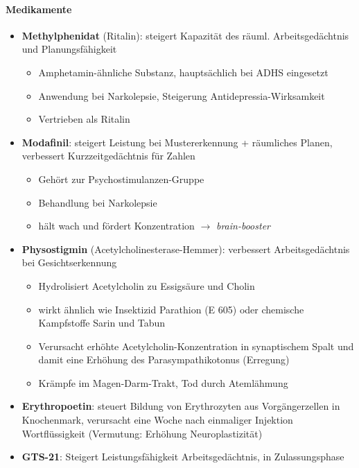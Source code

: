 \paragraph{Medikamente}
\begin{itemize}
  \item \textbf{Methylphenidat} (Ritalin): steigert Kapazität des räuml. Arbeitsgedächtnis und Planungsfähigkeit
  \begin{itemize}
    \item Amphetamin-ähnliche Substanz, hauptsächlich bei ADHS eingesetzt
    \item Anwendung bei Narkolepsie, Steigerung Antidepressia-Wirksamkeit
    \item Vertrieben als Ritalin
  \end{itemize}
  \item \textbf{Modafinil}: steigert Leistung bei Mustererkennung + räumliches Planen, verbessert Kurzzeitgedächtnis für Zahlen
  \begin{itemize}
    \item Gehört zur Psychostimulanzen-Gruppe
    \item Behandlung bei Narkolepsie
    \item hält wach und fördert Konzentration \( \to \) \emph{brain-booster}
  \end{itemize}
  \item \textbf{Physostigmin} (Acetylcholinesterase-Hemmer): verbessert Arbeitsgedächtnis bei Gesichtserkennung
  \begin{itemize}
    \item Hydrolisiert Acetylcholin zu Essigsäure und Cholin
    \item wirkt ähnlich wie Insektizid Parathion (E 605) oder chemische Kampfstoffe Sarin und Tabun
    \item Verursacht erhöhte Acetylcholin-Konzentration in synaptischem Spalt und damit eine Erhöhung des Parasympathikotonus (Erregung)
    \item Krämpfe im Magen-Darm-Trakt, Tod durch Atemlähmung
  \end{itemize}
  \item \textbf{Erythropoetin}: steuert Bildung von Erythrozyten aus Vorgängerzellen in Knochenmark, verursacht eine Woche nach einmaliger Injektion Wortflüssigkeit (Vermutung: Erhöhung Neuroplastizität)
  \item \textbf{GTS-21}: Steigert Leistungsfähigkeit Arbeitsgedächtnis, in Zulassungsphase
\end{itemize}

